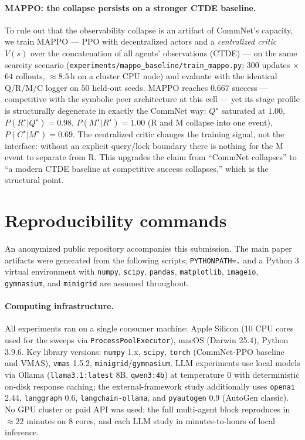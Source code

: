 \documentclass{article}
\newcommand{\method}[1]{\texttt{#1}}
\begin{document}
\paragraph{MAPPO: the collapse persists on a stronger CTDE baseline.}
To rule out that the observability collapse is an artifact of CommNet's
capacity, we train MAPPO \citep{yu2022mappo} --- PPO with decentralized actors
and a \emph{centralized critic} $V(s)$ over the concatenation of all agents'
observations (CTDE) --- on the same scarcity scenario
(\method{experiments/mappo\_baseline/train\_mappo.py}; $300$ updates
$\times$ $64$ rollouts, $\approx8.5$\,h on a cluster CPU node) and evaluate with
the identical Q/R/M/C logger on $50$ held-out seeds. MAPPO reaches $0.667$
success --- competitive with the symbolic peer architecture at this cell ---
yet its stage profile is structurally degenerate in exactly the CommNet way:
$Q^\star$ saturated at $1.00$, $P(R^\star|Q^\star){=}0.98$,
$P(M^\star|R^\star){=}1.00$ (R and M collapse into one event),
$P(C^\star|M^\star){=}0.69$. The centralized critic changes the training
signal, not the interface: without an explicit query/lock boundary there is
nothing for the M event to separate from R. This upgrades the claim from
``CommNet collapses'' to ``a modern CTDE baseline at competitive success
collapses,'' which is the structural point.

\section{Reproducibility commands}
\label{p1:app:repro}

An anonymized public repository accompanies this submission. The main paper artifacts were generated from the following scripts; \texttt{PYTHONPATH=.} and a Python 3 virtual environment with \texttt{numpy}, \texttt{scipy}, \texttt{pandas}, \texttt{matplotlib}, \texttt{imageio}, \texttt{gymnasium}, and \texttt{minigrid} are assumed throughout.

\paragraph{Computing infrastructure.} All experiments ran on a single
consumer machine: Apple Silicon (10 CPU cores used for the sweeps via
\texttt{ProcessPoolExecutor}), macOS (Darwin 25.4), Python 3.9.6.
Key library versions: \texttt{numpy} 1.x, \texttt{scipy},
\texttt{torch} (CommNet-PPO baseline and VMAS), \texttt{vmas} 1.5.2,
\texttt{minigrid}/\texttt{gymnasium}. LLM experiments use local
models via Ollama (\texttt{llama3.1:latest} 8B, \texttt{qwen3:4b}) at
temperature $0$ with deterministic on-disk response caching; the
external-framework study additionally uses \texttt{openai} 2.44,
\texttt{langgraph} 0.6, \texttt{langchain-ollama}, and
\texttt{pyautogen} 0.9 (AutoGen classic). No GPU cluster or paid API
was used; the full multi-agent block reproduces in ${\approx}22$
minutes on 8 cores, and each LLM study in minutes-to-hours of local
inference.
\end{document}
